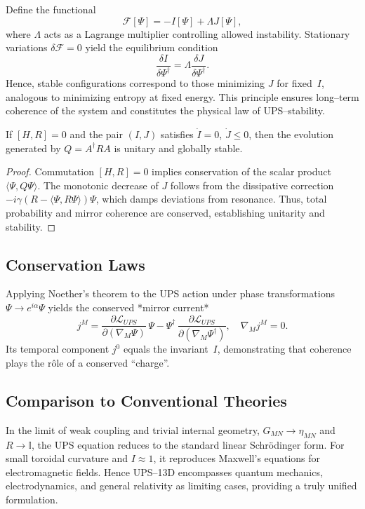 Define the functional
\[
\mathcal{F}[\Psi]
 = - I[\Psi] + \Lambda J[\Psi],
\]
where $\Lambda$ acts as a Lagrange multiplier
controlling allowed instability.
Stationary variations $\delta\mathcal{F}=0$
yield the equilibrium condition
\[
\frac{\delta I}{\delta \Psi^{\dagger}}
 = \Lambda \frac{\delta J}{\delta \Psi^{\dagger}}.
\]
Hence, stable configurations correspond to those
minimizing $J$ for fixed~$I$,
analogous to minimizing entropy at fixed energy.
This principle ensures long--term coherence of the system
and constitutes the physical law of UPS--stability.

\begin{theorem}
If $[H,R]=0$ and the pair $(I,J)$ satisfies
$\dot{I}=0$, $\dot{J}\le 0$,
then the evolution generated by $Q=A^{\dagger}RA$
is unitary and globally stable.
\end{theorem}

\begin{proof}
Commutation $[H,R]=0$ implies conservation of
the scalar product $\langle\Psi,Q\Psi\rangle$.
The monotonic decrease of $J$
follows from the dissipative correction
$-i\gamma(R - \langle\Psi,R\Psi\rangle)\Psi$,
which damps deviations from resonance.
Thus, total probability and mirror coherence are conserved,
establishing unitarity and stability.
\end{proof}

\subsection{Conservation Laws}

Applying Noether’s theorem to the UPS action
under phase transformations $\Psi \rightarrow e^{i\alpha}\Psi$
yields the conserved *mirror current*
\[
j^M = \frac{\partial\mathcal{L}_{UPS}}{\partial(\nabla_M \Psi)} \, \Psi
      - \Psi^{\dagger}\,\frac{\partial\mathcal{L}_{UPS}}
        {\partial(\nabla_M \Psi^{\dagger})},
\quad
\nabla_M j^M = 0.
\]
Its temporal component $j^0$ equals the invariant~$I$,
demonstrating that coherence plays the rôle of a conserved “charge”.

\subsection{Comparison to Conventional Theories}

In the limit of weak coupling and trivial internal geometry,
$G_{MN}\!\rightarrow\!\eta_{MN}$ and $R\!\rightarrow\!\mathbb{I}$,
the UPS equation reduces to the standard linear Schrödinger form.
For small toroidal curvature and $I\!\approx\!1$,
it reproduces Maxwell’s equations for electromagnetic fields.
Hence UPS–13D encompasses quantum mechanics,
electrodynamics, and general relativity as limiting cases,
providing a truly unified formulation.

